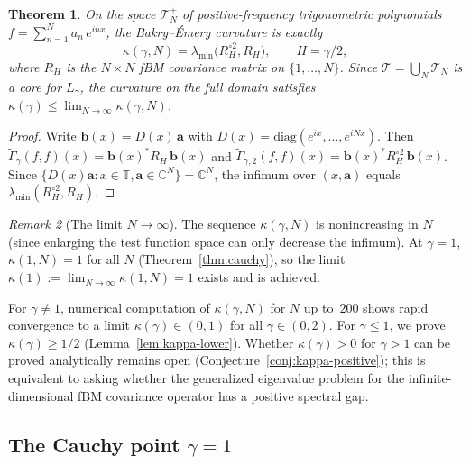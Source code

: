 \documentclass[11pt,a4paper]{article}
\theoremstyle{plain}
\newtheorem{theorem}{Theorem}[section]
\theoremstyle{definition}
\theoremstyle{remark}
\newtheorem{remark}[theorem]{Remark}
\newcommand{\C}{\mathbb{C}}
\newcommand{\T}{\mathbb{T}}
\begin{document}
\begin{theorem}\label{thm:curvature}
On the space $\mathcal{T}_N^+$ of positive-frequency trigonometric
polynomials $f = \sum_{n=1}^N a_n\,e^{inx}$, the Bakry--\'Emery
curvature is exactly
\begin{equation}\label{eq:kappa-def}
  \kappa(\gamma,N) = \lambda_{\min}\!\bigl(R_H^{\circ 2}, R_H\bigr),
  \qquad H = \gamma/2,
\end{equation}
where $R_H$ is the $N \times N$ fBM covariance matrix on $\{1,\ldots,N\}$.
Since $\mathcal{T} = \bigcup_N \mathcal{T}_N$ is a core for $L_\gamma$,
the curvature on the full domain satisfies
$\kappa(\gamma) \leq \lim_{N\to\infty} \kappa(\gamma,N)$.
\end{theorem}

\begin{proof}
Write $\mathbf{b}(x) = D(x)\,\mathbf{a}$ with
$D(x) = \mathrm{diag}(e^{ix},\ldots,e^{iNx})$. Then
$\widetilde{\Gamma}_\gamma(f,f)(x) = \mathbf{b}(x)^* R_H\,\mathbf{b}(x)$
and $\widetilde{\Gamma}_{\gamma,2}(f,f)(x) =
\mathbf{b}(x)^* R_H^{\circ 2}\,\mathbf{b}(x)$.
Since $\{D(x)\mathbf{a} : x \in \T, \mathbf{a} \in \C^N\} = \C^N$,
the infimum over $(x,\mathbf{a})$ equals
$\lambda_{\min}(R_H^{\circ 2}, R_H)$.
\end{proof}

\begin{remark}[The limit $N \to \infty$]
\label{rem:N-limit}
The sequence $\kappa(\gamma,N)$ is nonincreasing in $N$
(since enlarging the test function space can only decrease
the infimum).  At $\gamma = 1$, $\kappa(1,N) = 1$ for all
$N$ (Theorem~\ref{thm:cauchy}), so the limit
$\kappa(1) := \lim_{N\to\infty}\kappa(1,N) = 1$ exists
and is achieved.

For $\gamma \neq 1$, numerical computation of $\kappa(\gamma,N)$
for $N$ up to~$200$ shows rapid convergence to a limit
$\kappa(\gamma) \in (0,1)$ for all $\gamma \in (0,2)$.
For $\gamma \leq 1$, we prove $\kappa(\gamma) \geq 1/2$
(Lemma~\ref{lem:kappa-lower}). Whether $\kappa(\gamma) > 0$
for $\gamma > 1$ can be proved analytically remains open
(Conjecture~\ref{conj:kappa-positive});
this is equivalent to asking
whether the generalized eigenvalue problem for the
infinite-dimensional fBM covariance operator has a positive
spectral gap.
\end{remark}


\subsection{The Cauchy point $\gamma = 1$}\label{sec:cauchy}
\end{document}
